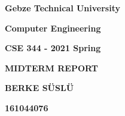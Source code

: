 \documentclass[12pt]{article}
\begin{document}
\vspace{\baselineskip}

\vspace{\baselineskip}

\vspace{\baselineskip}

\vspace{\baselineskip}

\vspace{\baselineskip}

\vspace{\baselineskip}
\begin{Center}
{\fontsize{16pt}{19.2pt}\selectfont \textbf{Gebze Technical University}}
\end{Center}
\begin{Center}
{\fontsize{16pt}{19.2pt}\selectfont \textbf{Computer Engineering}}
\end{Center}

\vspace{\baselineskip}

\vspace{\baselineskip}

\vspace{\baselineskip}
\begin{Center}
{\fontsize{16pt}{19.2pt}\selectfont \textbf{CSE 344 - 2021 Spring}}
\end{Center}

\vspace{\baselineskip}

\vspace{\baselineskip}

\vspace{\baselineskip}
\begin{Center}
{\fontsize{16pt}{19.2pt}\selectfont \textbf{MIDTERM REPORT}}
\end{Center}

\vspace{\baselineskip}

\vspace{\baselineskip}

\vspace{\baselineskip}

\vspace{\baselineskip}

\vspace{\baselineskip}

\vspace{\baselineskip}

\vspace{\baselineskip}
\begin{Center}
{\fontsize{16pt}{19.2pt}\selectfont \textbf{BERKE SÜSLÜ}}
\end{Center}
\begin{Center}
{\fontsize{16pt}{19.2pt}\selectfont \textbf{161044076}}
\end{Center}
\end{document}
